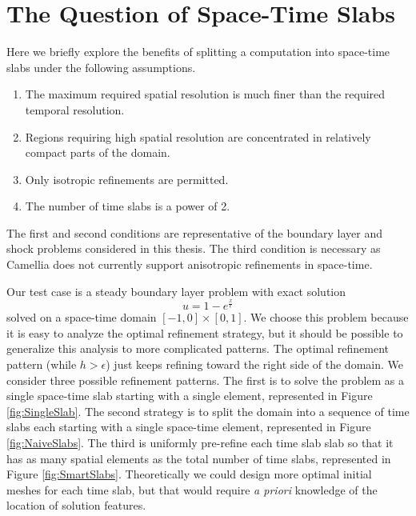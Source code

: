\documentclass[Dissertation.tex]{subfiles}
\begin{document}
\section{The Question of Space-Time Slabs}
Here we briefly explore the benefits of splitting a computation into space-time slabs under the following assumptions.
\begin{enumerate}
\item The maximum required spatial resolution is much finer than the required temporal resolution.
\item Regions requiring high spatial resolution are concentrated in relatively compact parts of the domain.
\item Only isotropic refinements are permitted.
\item The number of time slabs is a power of 2.
\end{enumerate}
The first and second conditions are representative of the boundary layer and 
shock problems considered in this thesis.
The third condition is necessary as Camellia does not currently support anisotropic refinements in space-time.

Our test case is a steady boundary layer problem with exact solution
\[
u=1-e^\frac{x}{\epsilon}
\]
solved on a space-time domain $[-1,0]\times[0,1]$.
We choose this problem because it is easy to analyze the optimal refinement strategy, but it should be
possible to generalize this analysis to more complicated patterns.
The optimal refinement pattern (while $h > \epsilon$) just keeps refining toward the right side of the domain.
We consider three possible refinement patterns. 
The first is to solve the problem as a single space-time slab starting with a single element, represented in
Figure \ref{fig:SingleSlab}.
The second strategy is to split the domain into a sequence of time slabs each starting with a single space-time element, represented in Figure \ref{fig:NaiveSlabs}.
The third is uniformly pre-refine each time slab slab so that it has as many spatial elements as the total number of time slabs, represented in Figure \ref{fig:SmartSlabs}.
Theoretically we could design more optimal initial meshes for each time slab, but that would 
require \emph{a priori} knowledge of the location of solution features.


\end{document}
